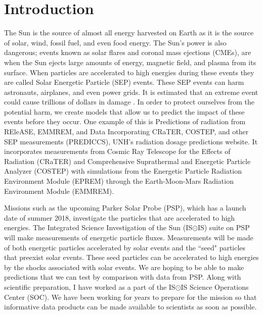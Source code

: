 \documentclass[%
 reprint,
 amsmath,amssymb,
 aps,
]{revtex4-1}
\begin{document}
\newpage

\tableofcontents

\newpage
\section{Introduction}

The Sun is the source of almost all energy harvested on Earth as it is the source of solar, wind, fossil fuel, and even food energy. The Sun's power is also dangerous; events known as solar flares and coronal mass ejections (CMEs), are when the Sun ejects large amounts of energy, magnetic field, and plasma from its surface. When particles are accelerated to high energies during these events they are called Solar Energetic Particle (SEP) events. These SEP events can harm astronauts, airplanes, and even power grids. It is estimated that an extreme event could cause trillions of dollars in damage \cite{nasacost}. In order to protect ourselves from the potential harm, we create models that allow us to predict the impact of these events before they occur. One example of this is  Predictions of radiation from REleASE, EMMREM, and Data Incorporating CRaTER, COSTEP, and other SEP measurements (PREDICCS), UNH's radiation dosage predictions website. It incorporates measurements from Cosmic Ray Telescope for the Effects of Radiation (CRaTER) and Comprehensive Suprathermal and Energetic Particle Analyzer (COSTEP) with simulations from the Energetic Particle Radiation Environment Module (EPREM) through the Earth-Moon-Mars Radiation Environment Module (EMMREM).

Missions such as the upcoming Parker Solar Probe (PSP), which has a launch date of summer 2018, investigate the particles that are accelerated to high energies. The Integrated Science Investigation of the Sun (IS$\odot$IS) suite on PSP will make measurements of energetic particle fluxes. Measurements will be made of both energetic particles accelerated by solar events and the ``seed" particles that preexist solar events. These seed particles can be accelerated to high energies by the shocks associated with solar events. We are hoping to be able to make predictions that we can test by comparison with data from PSP. Along with scientific preparation, I have worked as a part of the IS$\odot$IS Science Operations Center (SOC). We have been working for years to prepare for the mission so that informative data products can be made available to scientists as soon as possible. 
\end{document}

